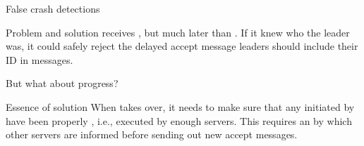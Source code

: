 \begin{slide}{False crash detections}
  \centering{}
  \begin{block}{Problem and solution}
     receives , but much later than
    . If it knew who the  leader was, it could safely reject
    the delayed accept message \mathexpr{\Rightarrow} leaders should include their ID in messages.
  \end{block}
\end{slide}
\begin{slide}{But what about progress?}
  \centering{}
  \onslide
  \begin{block}{Essence of solution}
    When  takes over, it needs to make sure that any  initiated by
     have been properly , i.e., executed by enough servers. This requires an
     by which other servers are informed before sending out new accept
    messages.
  \end{block}
\end{slide}
